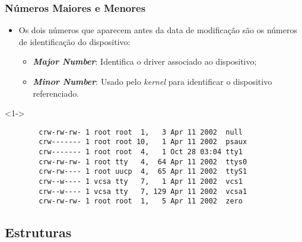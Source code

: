 \begin{frame}[fragile]
	\frametitle{Números Maiores e Menores}
	\begin{itemize}
		\item<1-> Os dois números que aparecem antes da data de modificação são os números de identificação do dispositivo:
		\begin{itemize}
		
			 {Esses são os significados tradicionais para esses números.}
			
			\item<1-> \textit{\textbf{Major Number}}: Identifica o driver associado ao dispositivo;
			\item<1-> \textit{\textbf{Minor Number}}: Usado pelo \textit{kernel} para identificar o dispositivo referenciado.
		\end{itemize}
	\end{itemize}
		
	\lstset{language=TeX, numbers=none}
	\begin{block}<1->{}
	\begin{lstlisting}
	    crw-rw-rw- 1 root root  1,   3 Apr 11 2002  null
	    crw------- 1 root root 10,   1 Apr 11 2002  psaux
	    crw------- 1 root root  4,   1 Oct 28 03:04 tty1
	    crw-rw-rw- 1 root tty   4,  64 Apr 11 2002  ttys0
	    crw-rw---- 1 root uucp  4,  65 Apr 11 2002  ttyS1
	    crw--w---- 1 vcsa tty   7,   1 Apr 11 2002  vcs1
	    crw--w---- 1 vcsa tty   7, 129 Apr 11 2002  vcsa1
	    crw-rw-rw- 1 root root  1,   5 Apr 11 2002  zero
	\end{lstlisting}
	\end{block}
	
\end{frame}


\subsection*{Estruturas} %


